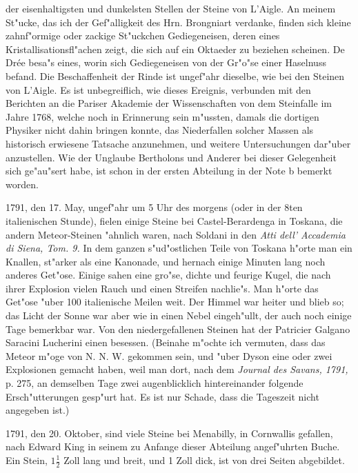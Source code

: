 \documentclass[a4paper, 11pt, oneside, polutonikogreek, german]{article}
\begin{document}
der eisenhaltigsten und dunkelsten Stellen der Steine von L'Aigle. An meinem St"ucke, das ich der Gef"alligkeit des Hrn. Brongniart verdanke, finden sich kleine zahnf"ormige oder zackige St"uckchen Gediegeneisen, deren eines Kristallisationsfl"achen zeigt, die sich auf ein Oktaeder zu beziehen scheinen. De Drée besa"s eines, worin sich Gediegeneisen von der Gr"o"se einer Haselnuss befand. Die Beschaffenheit der Rinde ist ungef"ahr dieselbe, wie bei den Steinen von L'Aigle. Es ist unbegreiflich, wie dieses Ereignis, verbunden mit den Berichten an die Pariser Akademie der Wissenschaften von dem Steinfalle im Jahre 1768, welche noch in Erinnerung sein m"ussten, damals die dortigen Physiker nicht dahin bringen konnte, das Niederfallen solcher Massen als historisch erwiesene Tatsache anzunehmen, und weitere Untersuchungen dar"uber anzustellen. Wie der Unglaube Bertholons und Anderer bei dieser Gelegenheit sich ge"au"sert habe, ist schon in der ersten Abteilung in der Note b bemerkt worden.

1791, den 17. May, ungef"ahr um 5 Uhr des morgens (oder in der 8ten italienischen Stunde), fielen einige Steine bei Castel-Berardenga in Toskana, die andern Meteor-Steinen "ahnlich waren, nach Soldani in den \emph{Atti dell' Accademia di Siena, Tom. 9.} In dem ganzen s"ud"ostlichen Teile von Toskana h"orte man ein Knallen, st"arker als eine Kanonade, und hernach einige Minuten lang noch anderes Get"ose. Einige sahen eine gro"se, dichte und feurige Kugel, die nach ihrer Explosion vielen Rauch und einen Streifen nachlie"s. Man h"orte das Get"ose "uber 100 italienische Meilen weit. Der Himmel war heiter und blieb so; das Licht der Sonne war aber wie in einen Nebel eingeh"ullt, der auch noch einige Tage bemerkbar war. Von den niedergefallenen Steinen hat der Patricier Galgano Saracini Lucherini einen besessen. (Beinahe m"ochte ich vermuten, dass das Meteor m"oge von N. N. W. gekommen sein, und "uber Dyson eine oder zwei Explosionen gemacht haben, weil man dort, nach dem \emph{Journal des Savans, 1791,} p. 275, an demselben Tage zwei augenblicklich hintereinander folgende Ersch"utterungen gesp"urt hat. Es ist nur Schade, dass die Tageszeit nicht angegeben ist.)

1791, den 20. Oktober, sind viele Steine bei Menabilly, in Cornwallis gefallen, nach Edward King in seinem zu Anfange dieser Abteilung angef"uhrten Buche. Ein Stein, $\mathfrak{1\frac{1}{2}}$ Zoll lang und breit, und 1 Zoll dick, ist von drei Seiten abgebildet.
\end{document}
